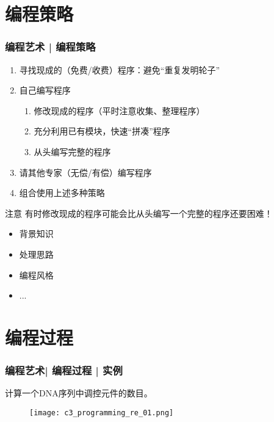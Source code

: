 \section{编程策略}
\begin{frame}
  \frametitle{编程艺术 | \alert{编程策略}}
  \begin{enumerate}
    \item 寻找现成的（免费/收费）程序：避免“重复发明轮子”
    \item 自己编写程序
      \begin{enumerate}
	\item 修改现成的程序（平时注意收集、整理程序）
	\item 充分利用已有模块，快速“拼凑”程序
	\item 从头编写完整的程序
      \end{enumerate}
    \item 请其他专家（无偿/有偿）编写程序
    \item 组合使用上述多种策略
  \end{enumerate}
  \pause
  \begin{block}{注意}
    有时修改现成的程序可能会比从头编写一个完整的程序还要困难！
    \begin{itemize}
      \item 背景知识
      \item 处理思路
      \item 编程风格
      \item ...
    \end{itemize}
  \end{block}
\end{frame}

\section{编程过程}
\begin{frame}
  \frametitle{编程艺术| 编程过程 | 实例}
  \begin{center}
    {\Large 计算一个DNA序列中调控元件的数目。}
  \end{center}
  \begin{figure}
    \centering
    \texttt{[image: c3\_programming\_re\_01.png]}
  \end{figure}
\end{frame}

